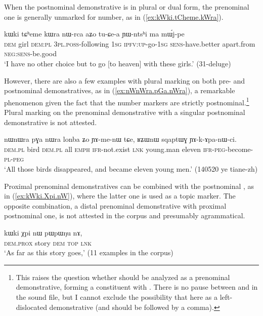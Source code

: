 When the postnominal demonstrative is in plural or dual form, the prenominal one is generally unmarked for number, as in (\ref{ex:kWki.tCheme.kWra}).

\begin{exe}
\ex \label{ex:kWki.tCheme.kWra}
 \gll kɯki tɕʰeme kɯra nɯ-rca aʑo tu-ɕe-a ɲɯ-ntsʰi ma mɯ́j-pe \\
 \textsc{dem} girl \textsc{dem}:\textsc{pl} \textsc{3pl}.\textsc{poss}-following \textsc{1sg} \textsc{ipfv}:\textsc{up}-go-\textsc{1sg} \textsc{sens}-have.better apart.from \textsc{neg}:\textsc{sens}-be.good \\
 \glt `I have no other choice but to go [to heaven] with these girls.' (31-deluge)
 \end{exe}

However, there are also a few examples with plural marking on both pre- and postnominal demonstratives, as in (\ref{ex:nWnWra.pGa.nWra}), a remarkable phenomenon given the fact that the number markers are strictly postnominal.\footnote{This raises the question whether  should be analyzed as a prenominal demonstrative, forming a constituent with . There is no pause between  and  in the sound file, but I cannot exclude the possibility that  here as a left-dislocated demonstrative (and should be followed by a comma).  } Plural marking on the prenominal demonstrative with a singular postnominal demonstrative is not attested.
 
\begin{exe}
\ex \label{ex:nWnWra.pGa.nWra}
 \gll nɯnɯra pɣa nɯra lonba ʑo ɲɤ-me-nɯ tɕe, ʁʑɯnɯ sqaptɯɣ ɲɤ-k-ɤpa-nɯ-ci. \\
 \textsc{dem}.\textsc{pl} bird  \textsc{dem}.\textsc{pl}  all \textsc{emph} \textsc{ifr}-not.exist \textsc{lnk} young.man eleven \textsc{ifr}-\textsc{peg}-become-\textsc{pl}-\textsc{peg} \\
 \glt `All those birds disappeared, and became eleven young men.' (140520 ye tiane-zh)
\end{exe}

Proximal prenominal demonstratives can be combined with the postnominal , as in (\ref{ex:kWki.Xpi.nW}), where the latter one is used as a topic marker. The opposite combination, a distal prenominal demonstrative with proximal postnominal one, is not attested in the corpus and presumably agrammatical.

\begin{exe}
\ex \label{ex:kWki.Xpi.nW}
 \gll kɯki χpi nɯ pɯpɯŋu nɤ,  \\
 \textsc{dem}.\textsc{prox} story \textsc{dem} \textsc{top} \textsc{lnk} \\
 \glt `As far as this story goes,' (11 examples in the corpus)
\end{exe}

